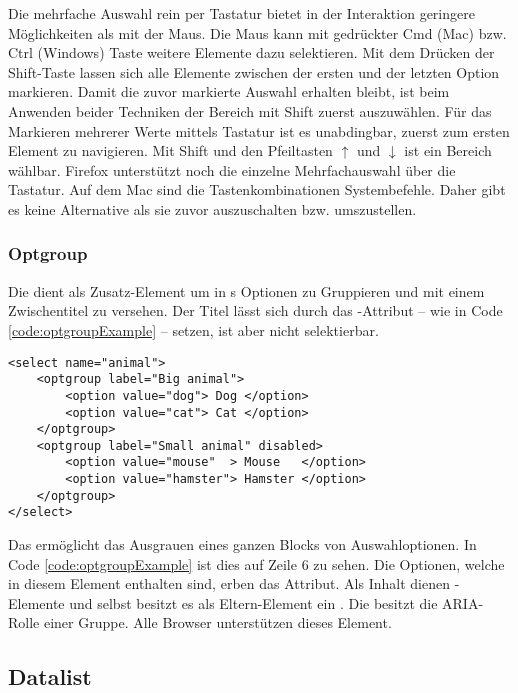 Die mehrfache Auswahl rein per Tastatur bietet in der Interaktion geringere Möglichkeiten als mit der Maus. 
Die Maus kann mit gedrückter Cmd (Mac) bzw. Ctrl (Windows) Taste weitere Elemente dazu selektieren. 
Mit dem Drücken der Shift-Taste lassen sich alle Elemente zwischen der ersten und der letzten Option markieren. 
Damit die zuvor markierte Auswahl erhalten bleibt, ist beim Anwenden beider Techniken der Bereich mit Shift zuerst auszuwählen. 
Für das Markieren mehrerer Werte mittels Tastatur ist es unabdingbar, zuerst zum ersten Element zu navigieren. 
Mit Shift und den Pfeiltasten $\uparrow$ und $\downarrow$ ist ein Bereich wählbar. 
Firefox unterstützt noch die einzelne Mehrfachauswahl über die Tastatur. 
Auf dem Mac sind die Tastenkombinationen Systembefehle. 
Daher gibt es keine Alternative als sie zuvor auszuschalten bzw. umszustellen. 


\subsubsection{\color{dblue} \color{dgray} Optgroup}
\label{sec:optgroup}

Die  dient als Zusatz-Element um in s Optionen zu Gruppieren und mit einem Zwischentitel zu versehen. 
Der Titel lässt sich durch das -Attribut – wie in Code \ref{code:optgroupExample} – setzen, ist aber nicht selektierbar. 

\begin{lstlisting}[style = htmlcssjs, caption = Optgroup Beispiel, label = code:optgroupExample]
<select name="animal">
    <optgroup label="Big animal">
        <option value="dog"> Dog </option>
        <option value="cat"> Cat </option>
    </optgroup>
    <optgroup label="Small animal" disabled>
        <option value="mouse"  > Mouse   </option>
        <option value="hamster"> Hamster </option>
    </optgroup>
</select>
\end{lstlisting}

Das  ermöglicht das Ausgrauen eines ganzen Blocks von Auswahloptionen. 
In Code \ref{code:optgroupExample} ist dies auf Zeile 6 zu sehen. 
Die Optionen, welche in diesem Element enthalten sind, erben das Attribut. 
Als Inhalt dienen -Elemente und selbst besitzt es als Eltern-Element ein . 
Die  besitzt die ARIA-Rolle einer Gruppe. 
Alle Browser unterstützen dieses Element. 


\subsection{Datalist}
\label{sec:datalist}

